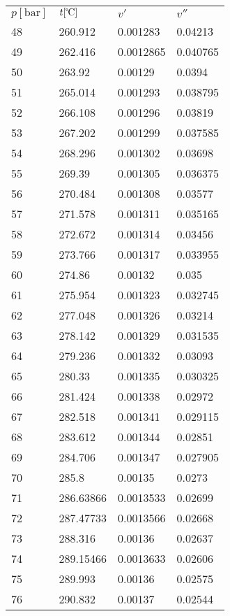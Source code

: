 \documentclass[twocolumn]{article}
\begin{document}
\begin{tabular}{l|l|l|l}
$p [\text{bar}] $ & $t [\text{\textcelsius{}}]$ & $v'$ & $v''$ \\
48	&	260.912	&	0.001283	&	0.04213  \\ \hline
49	&	262.416	&	0.0012865	&	0.040765  \\ \hline
50	&	263.92	&	0.00129	&	0.0394  \\ \hline
51	&	265.014	&	0.001293	&	0.038795  \\ \hline
52	&	266.108	&	0.001296	&	0.03819  \\ \hline
53	&	267.202	&	0.001299	&	0.037585  \\ \hline
54	&	268.296	&	0.001302	&	0.03698  \\ \hline
55	&	269.39	&	0.001305	&	0.036375  \\ \hline
56	&	270.484	&	0.001308	&	0.03577  \\ \hline
57	&	271.578	&	0.001311	&	0.035165  \\ \hline
58	&	272.672	&	0.001314	&	0.03456  \\ \hline
59	&	273.766	&	0.001317	&	0.033955  \\ \hline
60	&	274.86	&	0.00132	&	0.035  \\ \hline
61	&	275.954	&	0.001323	&	0.032745  \\ \hline
62	&	277.048	&	0.001326	&	0.03214  \\ \hline
63	&	278.142	&	0.001329	&	0.031535  \\ \hline
64	&	279.236	&	0.001332	&	0.03093  \\ \hline
65	&	280.33	&	0.001335	&	0.030325  \\ \hline
66	&	281.424	&	0.001338	&	0.02972  \\ \hline
67	&	282.518	&	0.001341	&	0.029115  \\ \hline
68	&	283.612	&	0.001344	&	0.02851  \\ \hline
69	&	284.706	&	0.001347	&	0.027905  \\ \hline
70	&	285.8	&	0.00135	&	0.0273  \\ \hline
71	&	286.63866&	0.0013533&	0.02699  \\ \hline
72	&	287.47733&	0.0013566&	0.02668  \\ \hline
73	&	288.316	&	0.00136	&	0.02637  \\ \hline
74	&	289.15466&	0.0013633&	0.02606  \\ \hline
75	&	289.993&	0.00136&	0.02575  \\ \hline
76	&	290.832	&	0.00137	&	0.02544  \\ \hline

\end{tabular}
\end{document}
